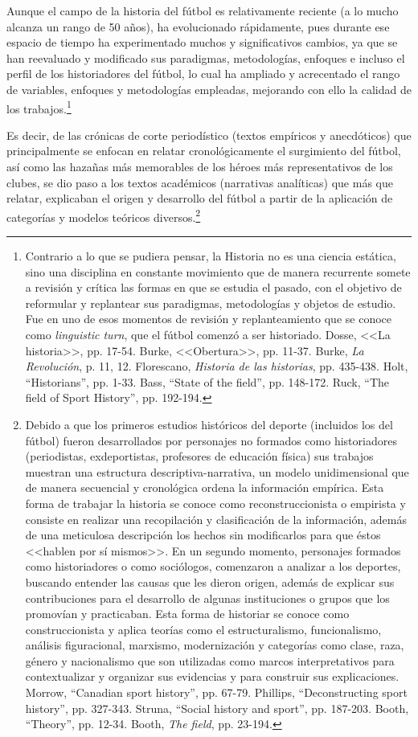 \documentclass[11pt,a5paper,twoside]{book} %
\begin{document}
\noindent Aunque el campo de la historia del fútbol es relativamente reciente (a lo mucho alcanza un
rango de 50 años), ha evolucionado rápidamente, pues durante ese espacio de tiempo ha
experimentado muchos y significativos cambios, ya que se han reevaluado y modificado sus
paradigmas, metodologías, enfoques e incluso el perfil de los historiadores del fútbol, lo cual
ha ampliado y acrecentado el rango de variables, enfoques y metodologías empleadas,
mejorando con ello la calidad de los trabajos.\footnote{Contrario a lo que se pudiera pensar, la Historia no es una ciencia estática, sino una disciplina en constante movimiento que de manera recurrente somete a revisión y crítica las formas en que se estudia el pasado, con el objetivo de reformular y replantear sus paradigmas, metodologías y objetos de estudio. Fue en uno de esos momentos de revisión y replanteamiento que se conoce como \emph{linguistic turn}, que el fútbol comenzó a ser historiado. Dosse, <<La historia>>, pp. 17-54. Burke, <<Obertura>>, pp. 11-37. Burke, \emph{La Revolución}, p. 11, 12. Florescano, \emph{Historia de las historias}, pp. 435-438. Holt, ``Historians'', pp. 1-33. Bass, ``State of the field'', pp. 148-172. Ruck, ``The field of Sport History'', pp. 192-194.}

Es decir, de las crónicas de corte periodístico (textos empíricos y anecdóticos) que
principalmente se enfocan en relatar cronológicamente el surgimiento del fútbol, así como
las hazañas más memorables de los héroes más representativos de los clubes, se dio paso a los textos académicos (narrativas analíticas) que más que relatar, explicaban el origen y
desarrollo del fútbol a partir de la aplicación de categorías y modelos teóricos diversos.\footnote{Debido a que los primeros estudios históricos del deporte (incluidos los del fútbol) fueron desarrollados por personajes no formados como historiadores (periodistas, exdeportistas, profesores de educación física) sus trabajos muestran una estructura descriptiva-narrativa, un modelo unidimensional que de manera secuencial y cronológica ordena la información empírica. Esta forma de trabajar la historia se conoce como reconstruccionista o empirista y consiste en realizar una recopilación y clasificación de la información, además de una meticulosa descripción los hechos sin modificarlos para que éstos <<hablen por sí mismos>>. En un segundo momento, personajes formados como historiadores o como sociólogos, comenzaron a analizar a los deportes, buscando entender las causas que les dieron origen, además de explicar sus contribuciones para el desarrollo de algunas instituciones o grupos que los promovían y practicaban. Esta forma de historiar se conoce como construccionista y aplica teorías como el estructuralismo, funcionalismo, análisis figuracional, marxismo, modernización y categorías como clase, raza, género y nacionalismo que son utilizadas como marcos interpretativos para contextualizar y organizar sus evidencias y para construir sus explicaciones. Morrow, ``Canadian sport history'', pp. 67-79. Phillips, ``Deconstructing sport history'', pp. 327-343. Struna, ``Social history and sport'', pp. 187-203. Booth, ``Theory'', pp. 12-34. Booth, \emph{The field}, pp. 23-194.}
\end{document}
